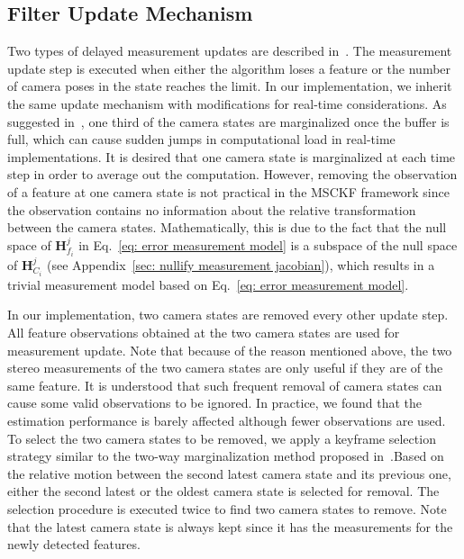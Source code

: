 \subsection{Filter Update Mechanism}
\label{subsec: filter update mechanism}
Two types of delayed measurement updates are described in~\cite{mourikis2007multi}. The measurement update step is executed when either the algorithm loses a feature or the number of camera poses in the state reaches the limit. In our implementation, we inherit the same update mechanism with modifications for real-time considerations. As suggested in~\cite{mourikis2007multi}, one third of the camera states are marginalized once the buffer is full, which can cause sudden jumps in computational load in real-time implementations. It is desired that one camera state is marginalized at each time step in order to average out the computation. However, removing the observation of a feature at one camera state is not practical in the MSCKF framework since the observation contains no information about the relative transformation between the camera states. Mathematically, this is due to the fact that the null space of $\mathbf{H}_{f_i}^j$ in Eq.~\eqref{eq: error measurement model} is a subspace of the null space of $\mathbf{H}_{C_i}^j$ (see Appendix~\ref{sec: nullify measurement jacobian}), which results in a trivial measurement model based on Eq.~\eqref{eq: error measurement model}. 

In our implementation, two camera states are removed every other update step. All feature observations obtained at the two camera states are used for measurement update. Note that because of the reason mentioned above, the two stereo measurements of the two camera states are only useful if they are of the same feature. It is understood that such frequent removal of camera states can cause some valid observations to be ignored. In practice, we found that the estimation performance is barely affected although fewer observations are used. To select the two camera states to be removed, we apply a keyframe selection strategy similar to the two-way marginalization method proposed in~\cite{shen2014initialization}.Based on the relative motion between the second latest camera state and its previous one, either the second latest or the oldest camera state is selected for removal. The selection procedure is executed twice to find two camera states to remove. Note that the latest camera state is always kept since it has the measurements for the newly detected features.